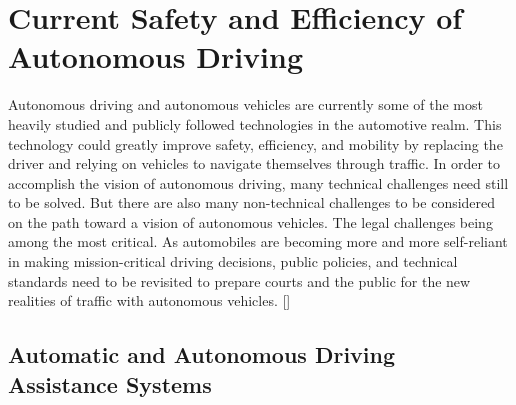 \documentclass{article}
\begin{document}
\section{Current Safety and Efficiency of Autonomous Driving}

Autonomous driving and autonomous vehicles are currently some of the most heavily studied and publicly followed technologies in the automotive realm. This technology could greatly improve safety, efficiency, and mobility by replacing the driver and relying on vehicles to navigate themselves through traffic. In order to accomplish the vision of autonomous driving, many technical challenges need still to be solved. But there are also many non-technical challenges to be considered on the path toward a vision of autonomous vehicles. The legal challenges being among the most critical. As automobiles are becoming more and more self-reliant in making mission-critical driving decisions, public policies, and technical standards need to be revisited to prepare courts and the public for the new realities of traffic with autonomous vehicles. [\textcite{beiker2012legal}]

\subsection{Automatic and Autonomous Driving Assistance Systems}
\end{document}
